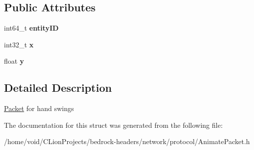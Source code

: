 \subsection*{Public Attributes}
\begin{DoxyCompactItemize}
\item 
\mbox{\label{struct_animate_packet_a1899695aa7a98f61f71af36e0441cd93}} 
int64\+\_\+t {\bfseries entity\+ID}
\item 
\mbox{\label{struct_animate_packet_a3d66f754c61feda1df1ea2467e0f883b}} 
int32\+\_\+t {\bfseries x}
\item 
\mbox{\label{struct_animate_packet_ad66f67a769cdc5b74d34d18b7ece037f}} 
float {\bfseries y}
\end{DoxyCompactItemize}


\subsection{Detailed Description}
\mbox{\hyperlink{struct_packet}{Packet}} for hand swings 

The documentation for this struct was generated from the following file\+:\begin{DoxyCompactItemize}
\item 
/home/void/\+C\+Lion\+Projects/bedrock-\/headers/network/protocol/Animate\+Packet.\+h\end{DoxyCompactItemize}
